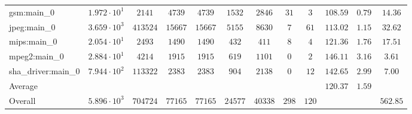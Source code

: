 \begin{tabular}{|l|c|c|c|c|c|c|c|c|c|c|c|}
gsm:main\_0             & $ 1.972 \cdot 10^{1}  $ & $ 2141   $ & $ 4739  $ & $ 4739  $ & $ 1532  $ & $ 2846  $ & $ 31  $ & $ 3   $ & $ 108.59      $ & $ 0.79    $ & $ 14.36   $ \\
jpeg:main\_0            & $ 3.659 \cdot 10^{3}  $ & $ 413524 $ & $ 15667 $ & $ 15667 $ & $ 5155  $ & $ 8630  $ & $ 7   $ & $ 61  $ & $ 113.02      $ & $ 1.15    $ & $ 32.62   $ \\
mips:main\_0            & $ 2.054 \cdot 10^{1}  $ & $ 2493   $ & $ 1490  $ & $ 1490  $ & $ 432   $ & $ 411   $ & $ 8   $ & $ 4   $ & $ 121.36      $ & $ 1.76    $ & $ 17.51   $ \\
mpeg2:main\_0           & $ 2.884 \cdot 10^{1}  $ & $ 4214   $ & $ 1915  $ & $ 1915  $ & $ 619   $ & $ 1101  $ & $ 0   $ & $ 2   $ & $ 146.11      $ & $ 3.16    $ & $ 3.61    $ \\
sha\_driver:main\_0     & $ 7.944 \cdot 10^{2}  $ & $ 113322 $ & $ 2383  $ & $ 2383  $ & $ 904   $ & $ 2138  $ & $ 0   $ & $ 12  $ & $ 142.65      $ & $ 2.99    $ & $ 7.00    $ \\
\hline
Average                 & $                     $ & $        $ & $       $ & $       $ & $       $ & $       $ & $     $ & $     $ & $ 120.37      $ & $ 1.59    $ & $         $ \\
\hline
Overall                 & $ 5.896 \cdot 10^{3}  $ & $ 704724 $ & $ 77165 $ & $ 77165 $ & $ 24577 $ & $ 40338 $ & $ 298 $ & $ 120 $ & $             $ & $         $ & $ 562.85  $ \\
\hline
\end{tabular}
